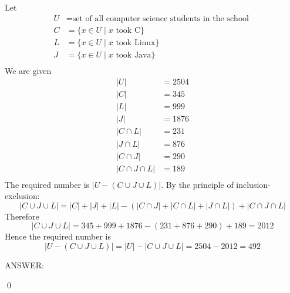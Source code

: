 Let
\begin{align*}
U &= \text{set of all computer science students in the school } \\ 
C &= \{ x \in U \mid x \text{ took C}\} \\ 
L &= \{ x \in U \mid x \text{ took Linux}\} \\ 
J &= \{ x \in U \mid x \text{ took Java}\} \\ 
\end{align*}
We are given
\begin{align*}
|U| &= 2504 \\
|C| &= 345 \\
|L| &= 999 \\
|J| &= 1876 \\
|C \cap L| &= 231 \\
|J \cap L| &= 876 \\
|C \cap J| &= 290 \\
|C \cap J \cap L| &= 189 \\
\end{align*}
The required number is $|U - (C \cup J \cup L)|$.
By the principle of inclusion-exclusion:
\[
|C \cup J \cup L| 
= |C| + |J| + |L| - (|C \cap J| + |C \cap L| + |J \cap L|) 
+ |C \cap J \cap L| 
\] 
Therefore
\[
|C \cup J \cup L| 
= 345 + 999 + 1876 - (231 + 876 + 290) + 189 = 2012
\] 
Hence the required number is
\[ 
|U - (C \cup J \cup L)| 
= |U| - |C \cup J \cup L| = 2504 - 2012 = 492 
\]

ANSWER:

\qed

